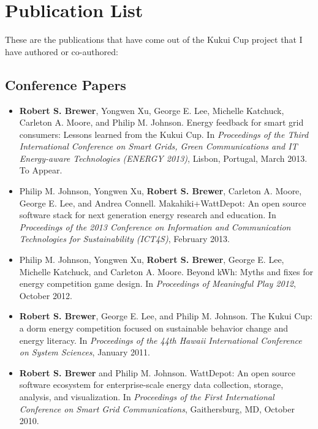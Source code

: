 \chapter{Publication List}
\label{app:publication-list}

These are the publications that have come out of the Kukui Cup project that I have authored or co-authored:

\section{Conference Papers}

\begin{itemize}

\item \textbf{Robert S. Brewer}, Yongwen Xu, George E. Lee, Michelle Katchuck, Carleton A. Moore, and Philip M. Johnson. Energy feedback for smart grid consumers: Lessons learned from the Kukui Cup. In \emph{Proceedings of the Third International Conference on Smart Grids, Green Communications and IT Energy-aware Technologies (ENERGY 2013)}, Lisbon, Portugal, March 2013. To Appear.

\item Philip M. Johnson, Yongwen Xu, \textbf{Robert S. Brewer}, Carleton A. Moore, George E. Lee, and Andrea Connell. Makahiki+WattDepot: An open source software stack for next generation energy research and education. In \emph{Proceedings of the 2013 Conference on Information and Communication Technologies for Sustainability (ICT4S)}, February 2013.

\item Philip M. Johnson, Yongwen Xu, \textbf{Robert S. Brewer}, George E. Lee, Michelle Katchuck, and Carleton A. Moore. Beyond kWh: Myths and fixes for energy competition game design. In \emph{Proceedings of Meaningful Play 2012}, October 2012.

\item \textbf{Robert S. Brewer}, George E. Lee, and Philip M. Johnson. The Kukui Cup: a dorm energy competition focused on sustainable behavior change and energy literacy. In \emph{Proceedings of the 44th Hawaii International Conference on System Sciences}, January 2011.

\item \textbf{Robert S. Brewer} and Philip M. Johnson. WattDepot: An open source software ecosystem for enterprise-scale energy data collection, storage, analysis, and visualization. In \emph{Proceedings of the First International Conference on Smart Grid Communications}, Gaithersburg, MD, October 2010.

\end{itemize}


